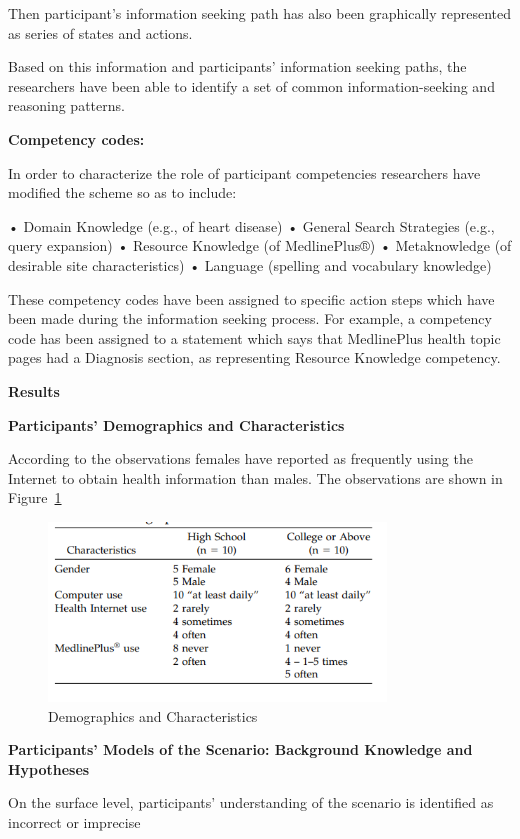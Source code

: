 \documentclass[]{article}
\begin{document}
Then participant’s information seeking path has also been graphically represented as series of states and actions. 
  
Based on this information and participants’ information seeking paths, the researchers have been able to identify a set of common information-seeking and reasoning patterns. 

\textbf{Competency codes:}

In order to characterize the role of participant competencies researchers have modified the scheme so as to include:

• Domain Knowledge (e.g., of heart disease) 
• General Search Strategies (e.g., query expansion) 
• Resource Knowledge (of MedlinePlus®) 
• Metaknowledge (of desirable site characteristics) 
• Language (spelling and vocabulary knowledge) 

These competency codes have been assigned to specific action steps which have been made during the information seeking process. For example, a competency code has been assigned to a statement which says that MedlinePlus health topic pages had a Diagnosis section, as representing Resource Knowledge competency.

\textbf{Results}

\textbf{Participants’ Demographics and Characteristics}

According to the observations females have reported as frequently using the Internet to obtain health information than males. The observations are shown in Figure~\ref{fig9}

\begin{figure}[b!]
	\includegraphics[width=0.8\textwidth]{Capture9.png}
	\caption{Demographics and Characteristics\label{fig9}}
\end{figure} 

\textbf{Participants’ Models of the Scenario: Background Knowledge and Hypotheses}

On the surface level, participants’ understanding of the scenario is identified as incorrect or imprecise
\end{document}
